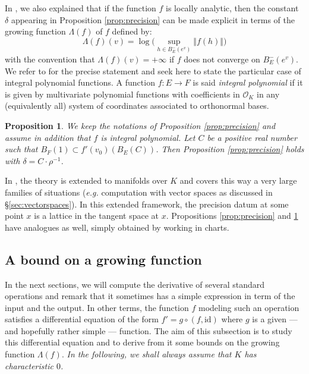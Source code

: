 \documentclass{sig-alternate}
\newtheorem{prop}[theo]{Proposition}
\renewcommand{\O}{\mathcal O}
\newcommand{\id}{\textrm{id}}
\begin{document}
In \cite{caruso-roe-vaccon:14a}, we also explained that if the function 
$f$ is locally analytic, then the constant $\delta$ appearing in
Proposition \ref{prop:precision} can be made explicit in terms of the
growing function $\Lambda(f)$ of $f$ defined by:
$$\textstyle \Lambda(f)(v) = 
\log \big( \sup_{h \in B^-_E(e^v)} \Vert 
f(h) \Vert \big)$$
with the convention that $\Lambda(f)(v) = +\infty$ if $f$ does not
converge on $B^-_E(e^v)$.
We refer to \cite[Proposition 3.12]{caruso-roe-vaccon:14a} for the
precise statement and seek here to state the particular case of
integral polynomial functions. A function $f : E \to F$ is said 
\emph{integral polynomial} if it is given by multivariate polynomial 
functions with coefficients in $\O_K$ in any (equivalently all) system 
of coordinates associated to orthonormal bases.

\begin{prop}
\label{prop:precision2}
We keep the notations of Proposition \ref{prop:precision} and assume 
in addition that $f$ is integral polynomial. Let $C$ be a positive real
number such that $B_F(1) \subset f'(v_0)(B_E(C))$. 
Then Proposition \ref{prop:precision} holds with $\delta = C \cdot
\rho^{-1}$.
\end{prop}

In \cite[Appendix A]{caruso-roe-vaccon:14a}, the theory is extended 
to manifolds over $K$ and covers this way a very large families of
situations (\emph{e.g.} computation with vector spaces as discussed
in \S \ref{sec:vectorspaces}). In this extended framework, the precision 
datum at some point $x$ is a lattice in the tangent space at $x$. 
Propositions \ref{prop:precision} and \ref{prop:precision2} have
analogues as well, simply obtained by working in charts.

\subsection{A bound on a growing function}
\label{ssec:boundLambdaf}

In the next sections, we will compute the derivative of several standard 
operations and remark that it sometimes has a simple expression in term 
of the input and the output. In other terms, the function $f$ modeling
such an operation satisfies a differential equation of the form
$f' = g \circ (f, \id)$
where $g$ is a given --- and hopefully rather simple --- function. The 
aim of this subsection is to study this differential equation and to 
derive from it some bounds on the growing function $\Lambda(f)$. 
\emph{In the following, we shall always assume that $K$ has 
characteristic $0$.}
\end{document}
